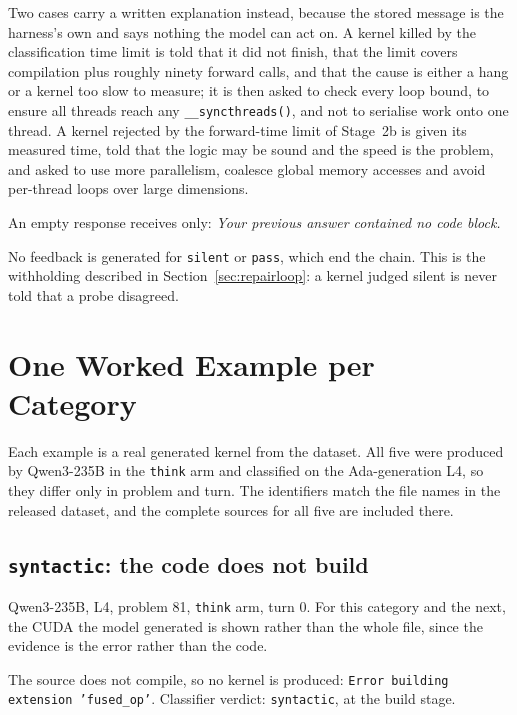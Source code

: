 \documentclass[12pt]{article}
\begin{document}
Two cases carry a written explanation instead, because the stored message is
the harness's own and says nothing the model can act on. A kernel killed by the
classification time limit is told that it did not finish, that the limit covers
compilation plus roughly ninety forward calls, and that the cause is either a
hang or a kernel too slow to measure; it is then asked to check every loop
bound, to ensure all threads reach any \texttt{\_\_syncthreads()}, and not to
serialise work onto one thread. A kernel rejected by the forward-time limit of
Stage~2b is given its measured time, told that the logic may be sound and the
speed is the problem, and asked to use more parallelism, coalesce global memory
accesses and avoid per-thread loops over large dimensions.

An empty response receives only: \emph{Your previous answer contained no code
block.}

No feedback is generated for \texttt{silent} or \texttt{pass}, which end the
chain. This is the withholding described in Section~\ref{sec:repairloop}: a kernel
judged silent is never told that a probe disagreed.

\section{One Worked Example per Category}
\label{app:examples}

Each example is a real generated kernel from the dataset. All five were
produced by Qwen3-235B in the \texttt{think} arm and classified on the
Ada-generation L4, so they differ only in problem and turn. The identifiers
match the file names in the released dataset, and the complete sources for all
five are included there.

\subsection*{\texttt{syntactic}: the code does not build}

\noindent Qwen3-235B, L4, problem 81, \texttt{think} arm, turn 0. For this
category and the next, the CUDA the model generated is shown rather than the
whole file, since the evidence is the error rather than the code.



\noindent The source does not compile, so no kernel is produced:
\texttt{Error building extension 'fused\_op'}. Classifier verdict:
\texttt{syntactic}, at the build stage.
\end{document}
